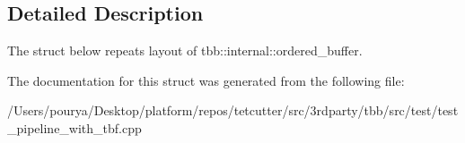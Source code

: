 \subsection{Detailed Description}
The struct below repeats layout of tbb\+::internal\+::ordered\+\_\+buffer. 

The documentation for this struct was generated from the following file\+:\begin{DoxyCompactItemize}
\item 
/\+Users/pourya/\+Desktop/platform/repos/tetcutter/src/3rdparty/tbb/src/test/test\+\_\+pipeline\+\_\+with\+\_\+tbf.\+cpp\end{DoxyCompactItemize}
